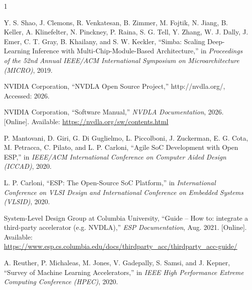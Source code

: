 \documentclass[10pt,sigconf,nonacm]{acmart}
\begin{document}
\begin{thebibliography}{1}

Y. S. Shao, J. Clemons, R. Venkatesan, B. Zimmer, M. Fojtik, N. Jiang, B. Keller, A. Klinefelter, N. Pinckney, P. Raina, S. G. Tell, Y. Zhang, W. J. Dally, J. Emer, C. T. Gray, B. Khailany, and S. W. Keckler, ``Simba: Scaling Deep-Learning Inference with Multi-Chip-Module-Based Architecture,'' in \emph{Proceedings of the 52nd Annual IEEE/ACM International Symposium on Microarchitecture (MICRO)}, 2019.

NVIDIA Corporation, ``NVDLA Open Source Project,'' http://nvdla.org/, Accessed: 2026.

NVIDIA Corporation, ``Software Manual,'' \emph{NVDLA Documentation}, 2026. [Online]. Available: \url{https://nvdla.org/sw/contents.html}

P. Mantovani, D. Giri, G. Di Guglielmo, L. Piccolboni, J. Zuckerman, E. G. Cota, M. Petracca, C. Pilato, and L. P. Carloni, ``Agile SoC Development with Open ESP,'' in \emph{IEEE/ACM International Conference on Computer Aided Design (ICCAD)}, 2020.

L. P. Carloni, ``ESP: The Open-Source SoC Platform,'' in \emph{International Conference on VLSI Design and International Conference on Embedded Systems (VLSID)}, 2020.

System-Level Design Group at Columbia University, ``Guide -- How to: integrate a third-party accelerator (e.g. NVDLA),'' \emph{ESP Documentation}, Aug. 2021. [Online]. Available: \url{https://www.esp.cs.columbia.edu/docs/thirdparty_acc/thirdparty_acc-guide/}

A. Reuther, P. Michaleas, M. Jones, V. Gadepally, S. Samsi, and J. Kepner, ``Survey of Machine Learning Accelerators,'' in \emph{IEEE High Performance Extreme Computing Conference (HPEC)}, 2020.

\end{thebibliography}
\end{document}
